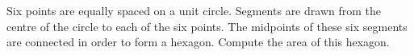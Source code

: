 Six points are equally spaced on a unit circle. Segments are drawn from the centre of the circle to each of the six points. The midpoints of these six segments are connected in order to form a hexagon. Compute the area of this hexagon.
